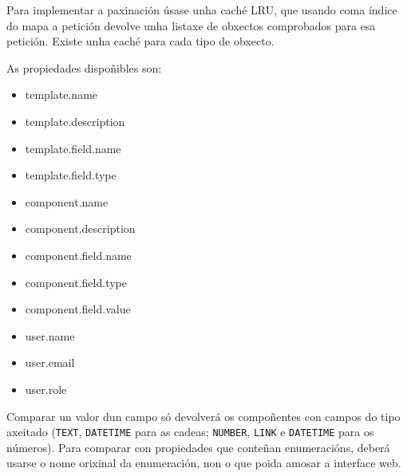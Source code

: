 Para implementar a paxinación úsase unha caché LRU, que usando coma índice do mapa a petición devolve unha listaxe de obxectos comprobados para esa petición. Existe unha caché para cada tipo de obxecto.

As propiedades dispoñibles son:

\begin{itemize}
	\item template.name
	\item template.description
	\item template.field.name
	\item template.field.type
	\item component.name
	\item component.description
	\item component.field.name
	\item component.field.type
	\item component.field.value
	\item user.name
	\item user.email
	\item user.role
\end{itemize}

Comparar un valor dun campo só devolverá os compoñentes con campos do tipo axeitado (\texttt{TEXT}, \texttt{DATETIME} para as cadeas; \texttt{NUMBER}, \texttt{LINK} e \texttt{DATETIME} para os números). Para comparar con propiedades que conteñan enumeracións, deberá usarse o nome orixinal da enumeración, non o que poida amosar a interface web.